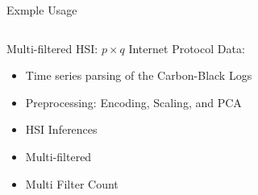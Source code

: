 \begin{frame}{Exmple Usage}
    \begin{columns}
        \begin{column}{.66\textwidth}
            Multi-filtered HSI:       
            $p\times q$ Internet Protocol Data:
            \begin{itemize}
                \item Time series parsing of the Carbon-Black Logs
                \item Preprocessing: Encoding, Scaling, and PCA
                \item HSI Inferences
                \item Multi-filtered
                \item Multi Filter Count
            \end{itemize}
        \end{column}
        \begin{column}{.33\textwidth}
            \bc
            \vspace{-.5in}
            \begin{figure}               

\end{figure}
\end{column}
\end{columns}
\end{frame}
